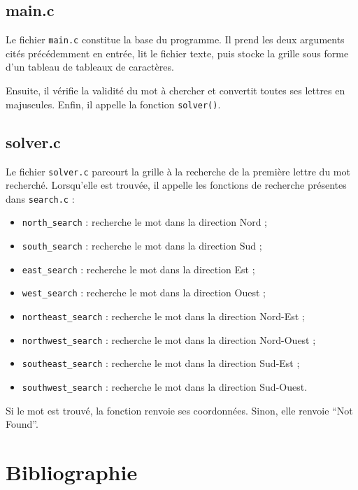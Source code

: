 \documentclass{article}
\begin{document}
\subsection{main.c}

Le fichier \texttt{main.c} constitue la base du programme.
Il prend les deux arguments cités précédemment en entrée, lit le fichier texte, puis stocke la grille sous forme d’un tableau de tableaux de caractères.

Ensuite, il vérifie la validité du mot à chercher et convertit toutes ses lettres en majuscules.
Enfin, il appelle la fonction \texttt{solver()}.

\subsection{solver.c}

Le fichier \texttt{solver.c} parcourt la grille à la recherche de la première lettre du mot recherché.
Lorsqu’elle est trouvée, il appelle les fonctions de recherche présentes dans \texttt{search.c} :

\begin{itemize}
    \item \texttt{north\_search} : recherche le mot dans la direction Nord ;
    \item \texttt{south\_search} : recherche le mot dans la direction Sud ;
    \item \texttt{east\_search} : recherche le mot dans la direction Est ;
    \item \texttt{west\_search} : recherche le mot dans la direction Ouest ;
    \item \texttt{northeast\_search} : recherche le mot dans la direction Nord-Est ;
    \item \texttt{northwest\_search} : recherche le mot dans la direction Nord-Ouest ;
    \item \texttt{southeast\_search} : recherche le mot dans la direction Sud-Est ;
    \item \texttt{southwest\_search} : recherche le mot dans la direction Sud-Ouest.
\end{itemize}

Si le mot est trouvé, la fonction renvoie ses coordonnées.
Sinon, elle renvoie ``Not Found''.


\newpage
\section*{Bibliographie}
\nocite{*}


\end{document}
